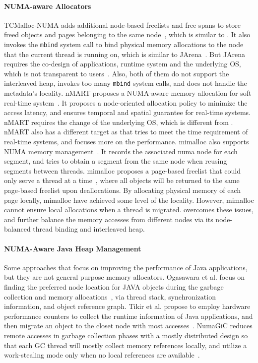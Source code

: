 \paragraph{NUMA-aware Allocators} TCMalloc-NUMA adds additional node-based freelists and free spans to store freed objects and pages belonging to the same node~\cite{tcmallocnew}, which is similar to \NM{}. It also invokes the \texttt{mbind} system call to bind physical memory allocations to the node that the current thread is running on, which is similar to JArena~\cite{yang2019jarena}. But JArena requires the co-design of applications, runtime system and the underlying OS, which is not transparent to users~\cite{yang2019jarena}. Also, both of them do not support the interleaved heap, invokes too many \texttt{mbind} system calls, and does not handle the metadata's locality. nMART proposes a NUMA-aware memory allocation for soft real-time system~\cite{kim2013node}. It proposes a node-oriented allocation policy to minimize the access latency, and ensures temporal and spatial guarantee for real-time systems. nMART requires the change of the underlying OS, which is different from \NM{}. nMART also has a different target as \NM{} that tries to meet the time requirement of real-time systems, and \NM{} focuses more on the performance. mimalloc also supports NUMA memory management~\cite{mimalloc}. It records the associated numa node for each segment, and tries to obtain a segment from the same node when reusing segments between threads. mimalloc proposes a page-based freelist that could only serve a thread at a time~\cite{mimalloc}, where all objects will be returned to the same page-based freelist upon deallocations. By allocating physical memory of each page locally, mimalloc have achieved some level of the locality. However, mimalloc cannot ensure local allocations when a thread is migrated. \NM{} overcomes these issues, and further balance the memory accesses from different nodes via its node-balanced thread binding and interleaved heap. 


\paragraph{NUMA-Aware Java Heap Management} Some approaches that focus on improving the performance of Java applications, but they are not general purpose memory allocators. Ogasawara et al. focus on finding the preferred node location for JAVA objects during the garbage collection and memory allocations~\cite{Ogasawara}, via thread stack, synchronization information, and object reference graph. Tikir et al. propose to employ hardware performance counters to collect the runtime information of Java applications, and then migrate an object to the closet node with most accesses~\cite{1419934}. 
NumaGiC reduces remote accesses in garbage collection phases with a mostly distributed design so that each GC thread will mostly collect memory references locally, and utilize a work-stealing mode only when no local references are available~\cite{NumaGiC}.


